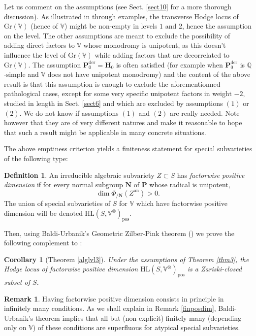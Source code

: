 \documentclass[10pt]{article}
\numberwithin{equation}{subsection}
\theoremstyle{plain}
\newtheorem{corollary}[theorem]{Corollary}
\theoremstyle{definition}
\newtheorem{definition}[theorem]{Definition}
\newtheorem{remark}[theorem]{Remark}
\theoremstyle{remark}
\newcommand{\Q}{\mathbb Q}
\newcommand{\V}{\mathbb V}
\newcommand{\pp}{\mathbf P}
\newcommand{\mon}{\mathbf H}
\newcommand{\NN}{\mathbf N}
\newcommand{\HL}{\mathrm{HL}(S, \V^\otimes)}
\newcommand{\an}{\mathrm{an}}
\newcommand{\gr}{\mathrm{Gr}}
\newcommand{\der}{\mathrm{der}}
\begin{document}
Let us comment on the assumptions (see Sect. \ref{sect10} for a more thorough discussion). As illustrated in \cite{bku} through examples, the transverse Hodge locus of $\gr(\V)$ (hence of $\V$) might be non-empty in levels $1$ and $2$, hence the assumption on the level. The other assumptions are meant to exclude the possibility of adding direct factors to $\V$ whose monodromy is unipotent, as this doesn't influence the level of $\gr(\V)$ while adding factors that are decorrelated to $\gr(\V)$. The assumption $\pp_0^\der = \mon_0$ is often satisfied (for example when $\pp_0^\der$ is $\Q$-simple and $\V$ does not have unipotent monodromy) and the content of the above result is that this assumption is enough to exclude the aforementionned pathological cases, except for some very specific unipotent factors in weight $-2$, studied in length in Sect. \ref{sect6} and which are excluded by assumptions $(1)$ or $(2)$. We do not know if assumptions $(1)$ and $(2)$ are really needed. Note however that they are of very different natures and make it reasonable to hope that such a result might be applicable in many concrete situations.

The above emptiness criterion yields a finiteness statement for special subvarieties of the following type:
\begin{definition}\label{posperdim}
An irreducible algebraic subvariety $Z \subset S$ has \textit{factorwise positive dimension} if for every normal subgroup $\NN$ of $\pp$ whose radical is unipotent,
\[
\dim \Phi_{/\NN}(Z^\an) > 0.
\]
 The union of special subvarieties of $S$ for $\V$ which have factorwise positive dimension will be denoted $\HL_{\mathrm{pos}}$.
\end{definition} 
Then, using Baldi-Urbanik's Geometric Zilber-Pink theorem (\cite{bu}) we prove the following complement to \cite[Thm. 3.2]{ketay}:
\begin{corollary}[Theorem \ref{alglvl3}]
Under the assumptions of Theorem \ref{thm3}, the Hodge locus of factorwise positive dimension $\HL_{\mathrm{pos}}$ is a Zariski-closed subset of $S$.
\end{corollary}
\begin{remark}
Having factorwise positive dimension consists in principle in infinitely many conditions. As we shall explain in Remark \ref{finposdim}, Baldi-Urbanik's theorem implies that all but (non-explicit) finitely many (depending only on $\V$) of these conditions are superfluous for atypical special subvarieties.
\end{remark}
\end{document}
